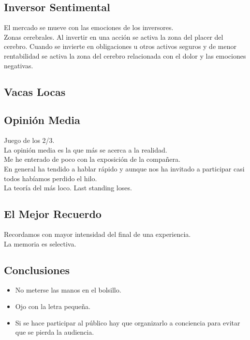 \documentclass[12pt, a4paper, twoside]{article}
\begin{document}
    \subsection{Inversor Sentimental}
    El mercado se mueve con las emociones de los inversores.\\
    Zonas cerebrales. Al invertir en una acción se activa la zona del placer del cerebro.
    Cuando se invierte en obligaciones u otros activos seguros y de menor rentabilidad se activa
    la zona del cerebro relacionada con el dolor y las emociones negativas.

    

    \subsection{Vacas Locas}
   
    \subsection{Opinión Media}
    Juego de los 2/3.\\
    La opinión media es la que más se acerca a la realidad.\\
    Me he enterado de poco con la exposición de la compañera.\\
    En general ha tendido a hablar rápido y aunque nos ha invitado a participar casi todos habíamos perdido el hilo.\\
    La teoría del más loco. Last standing loses.\\



    \subsection{El Mejor Recuerdo}
    Recordamos con mayor intensidad del final de una experiencia.\\
    La memoria es selectiva.\\

    \subsection{Conclusiones}
    \begin{itemize}
    \item No meterse las manos en el bolsillo.
    \item Ojo con la letra pequeña.
    \item Si se hace participar al público hay que organizarlo a conciencia para evitar que se pierda la audiencia.
    \end{itemize}
\end{document}
